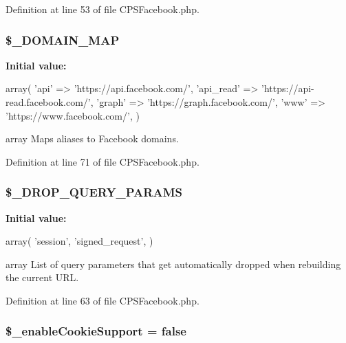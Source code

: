 Definition at line 53 of file CPSFacebook.php.

\hypertarget{classCPSFacebook_af39417a7550a728b1f3486fd0a9d3f55}{
\subsubsection[{\$\_\-DOMAIN\_\-MAP}]{\setlength{\rightskip}{0pt plus 5cm}\$\_\-DOMAIN\_\-MAP}}
\label{classCPSFacebook_af39417a7550a728b1f3486fd0a9d3f55}
{\bfseries Initial value:}
\begin{DoxyCode}
 array(
        'api' => 'https://api.facebook.com/',
        'api_read' => 'https://api-read.facebook.com/',
        'graph' => 'https://graph.facebook.com/',
        'www' => 'https://www.facebook.com/',
    )
\end{DoxyCode}
array Maps aliases to Facebook domains. 

Definition at line 71 of file CPSFacebook.php.

\hypertarget{classCPSFacebook_aced13da18a88b032dcdbe41db9c09ed3}{
\subsubsection[{\$\_\-DROP\_\-QUERY\_\-PARAMS}]{\setlength{\rightskip}{0pt plus 5cm}\$\_\-DROP\_\-QUERY\_\-PARAMS}}
\label{classCPSFacebook_aced13da18a88b032dcdbe41db9c09ed3}
{\bfseries Initial value:}
\begin{DoxyCode}
 array(
        'session',
        'signed_request',
    )
\end{DoxyCode}
array List of query parameters that get automatically dropped when rebuilding the current URL. 

Definition at line 63 of file CPSFacebook.php.

\hypertarget{classCPSFacebook_a6302bfba02d83c085b22d2aea1fc3bd6}{
\subsubsection[{\$\_\-enableCookieSupport}]{\setlength{\rightskip}{0pt plus 5cm}\$\_\-enableCookieSupport = false}}
\label{classCPSFacebook_a6302bfba02d83c085b22d2aea1fc3bd6}


